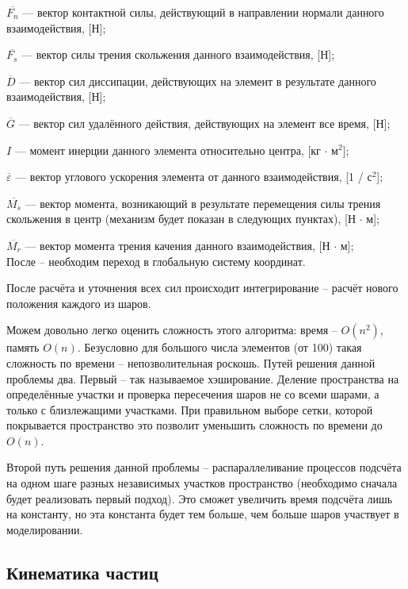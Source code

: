 \documentclass[a4paper]{article}
\begin{document}
$\overline{F_n}$ --- вектор контактной силы, действующий в направлении нормали данного взаимодействия, [Н];

$\overline{F_s}$ --- вектор силы трения скольжения данного взаимодействия, [Н];

$ \overline{D}$ --- вектор сил диссипации, действующих на элемент в результате данного взаимодействия, [Н];

$\overline{G}$ --- вектор сил удалённого действия, действующих на элемент все время, [Н];

$I$ --- момент инерции данного элемента относительно центра, [кг $ \cdot $ м$^2$];

$ \overline{\varepsilon}$ --- вектор углового ускорения элемента от данного взаимодействия, [1 / с$^2$];

$ \overline{M_s}$ --- вектор момента, возникающий в результате перемещения силы трения скольжения в центр (механизм будет показан в следующих пунктах), [Н $ \cdot $ м];

$\overline{M_r}$ --- вектор момента трения качения данного взаимодействия, [Н $ \cdot $ м];
\\

После -- необходим переход в глобальную систему координат.

После расчёта и уточнения всех сил происходит интегрирование -- расчёт нового положения каждого из шаров.

Можем довольно легко оценить сложность этого алгоритма: время -- $O(n^2)$, память $O(n)$. 
Безусловно для большого числа элементов (от 100) такая сложность по времени -- непозволительная роскошь.
Путей решения данной проблемы два.
Первый -- так называемое хэширование. 
Деление пространства на определённые участки и проверка пересечения шаров не со всеми шарами, а только с близлежащими участками.
При правильном выборе сетки, которой покрывается пространство это позволит уменьшить сложность по времени до $O(n)$.

Второй путь решения данной проблемы -- распараллеливание процессов подсчёта на одном шаге разных независимых участков пространство (необходимо сначала будет реализовать первый подход). Это сможет увеличить время подсчёта лишь на константу, но эта константа будет тем больше, чем больше шаров участвует в моделировании.


\subsection{Кинематика частиц}
\label{kinem_subsection}
\end{document}
